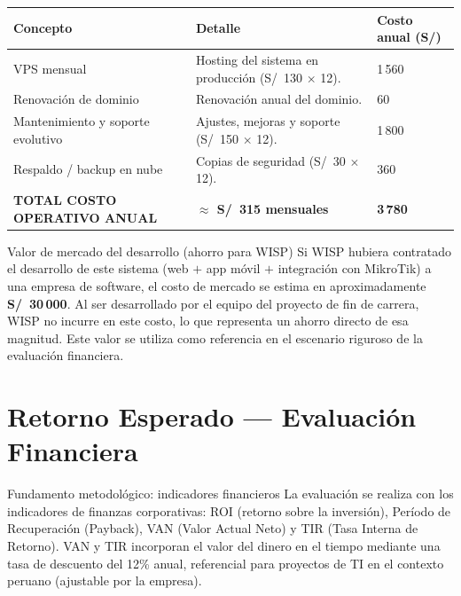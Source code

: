 \begin{center}
\label{tab:costos-op}
\begin{tabularx}{\textwidth}{L{4.2cm} X R{1.8cm}}
\toprule
\textbf{Concepto} & \textbf{Detalle} & \textbf{Costo anual (S/)} \\
\midrule
VPS mensual & Hosting del sistema en producción (S/~130 $\times$ 12). & 1\,560 \\
Renovación de dominio & Renovación anual del dominio. & 60 \\
Mantenimiento y soporte evolutivo & Ajustes, mejoras y soporte (S/~150 $\times$ 12). & 1\,800 \\
Respaldo / backup en nube & Copias de seguridad (S/~30 $\times$ 12). & 360 \\
\midrule
\textbf{TOTAL COSTO OPERATIVO ANUAL} & \textbf{$\approx$ S/~315 mensuales} & \textbf{3\,780} \\
\bottomrule
\end{tabularx}
\end{center}

\begin{upeubox}{Valor de mercado del desarrollo (ahorro para WISP)}
Si WISP hubiera contratado el desarrollo de este sistema (web $+$ app móvil $+$
integración con MikroTik) a una empresa de software, el costo de mercado se estima en
aproximadamente \textbf{S/~30\,000}. Al ser desarrollado por el equipo del proyecto de
fin de carrera, WISP no incurre en este costo, lo que representa un ahorro directo de
esa magnitud. Este valor se utiliza como referencia en el escenario riguroso de la
evaluación financiera.
\end{upeubox}

\section{Retorno Esperado — Evaluación Financiera}
\label{sec:retorno}

\begin{upeubox}{Fundamento metodológico: indicadores financieros}
La evaluación se realiza con los indicadores de finanzas corporativas: ROI (retorno
sobre la inversión), Período de Recuperación (Payback), VAN (Valor Actual Neto) y TIR
(Tasa Interna de Retorno). VAN y TIR incorporan el valor del dinero en el tiempo
mediante una tasa de descuento del 12\% anual, referencial para proyectos de TI en el
contexto peruano (ajustable por la empresa).
\end{upeubox}

